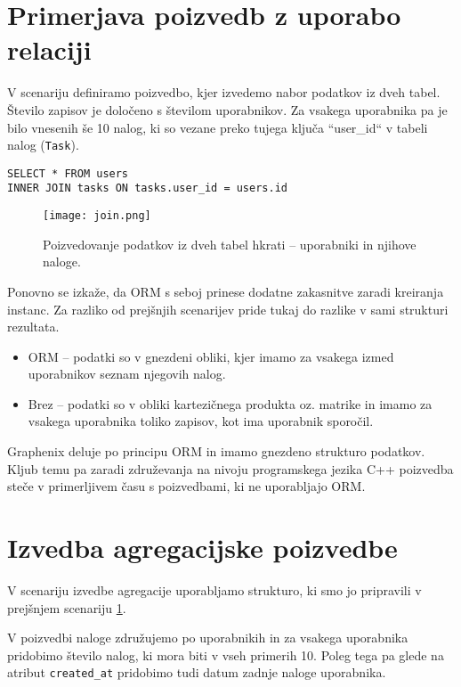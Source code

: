 \documentclass[a4paper,12pt,openright]{book}
\begin{document}
    \section{Primerjava poizvedb z uporabo relaciji}
    \label{join_lbl}

    V scenariju definiramo poizvedbo, kjer izvedemo nabor podatkov iz dveh tabel. Število zapisov je določeno s številom uporabnikov. Za vsakega uporabnika pa je bilo vnesenih še 10 nalog, ki so vezane preko tujega ključa ``user\_id`` v tabeli nalog ({\tt Task}).
    
\begin{verbatim}
SELECT * FROM users 
INNER JOIN tasks ON tasks.user_id = users.id
\end{verbatim}

    \begin{figure}[H]
        \centerline{\texttt{[image: join.png]}}
        \caption{Poizvedovanje podatkov iz dveh tabel hkrati – uporabniki in njihove naloge.}
        \label{join}
    \end{figure}

    \noindent
    Ponovno se izkaže, da ORM s seboj prinese dodatne zakasnitve zaradi kreiranja instanc. Za razliko od prejšnjih scenarijev pride tukaj do razlike v sami strukturi rezultata.
    
    \begin{itemize}
        \item ORM – podatki so v gnezdeni obliki, kjer imamo za vsakega izmed uporabnikov seznam njegovih nalog.
        \item Brez – podatki so v obliki kartezičnega produkta oz. matrike in imamo za vsakega uporabnika toliko zapisov, kot ima uporabnik sporočil.
    \end{itemize}

    \noindent
    Graphenix deluje po principu ORM in imamo gnezdeno strukturo podatkov. Kljub temu pa zaradi združevanja na nivoju programskega jezika C++ poizvedba steče v primerljivem času s poizvedbami, ki ne uporabljajo ORM.
    
    \section{Izvedba agregacijske poizvedbe}

    V scenariju izvedbe agregacije uporabljamo strukturo, ki smo jo pripravili v prejšnjem scenariju \ref{join_lbl}.

    V poizvedbi naloge združujemo po uporabnikih in za vsakega uporabnika pridobimo število nalog, ki mora biti v vseh primerih 10. Poleg tega pa glede na atribut {\tt created\_at} pridobimo tudi datum zadnje naloge uporabnika.
    
\end{document}
